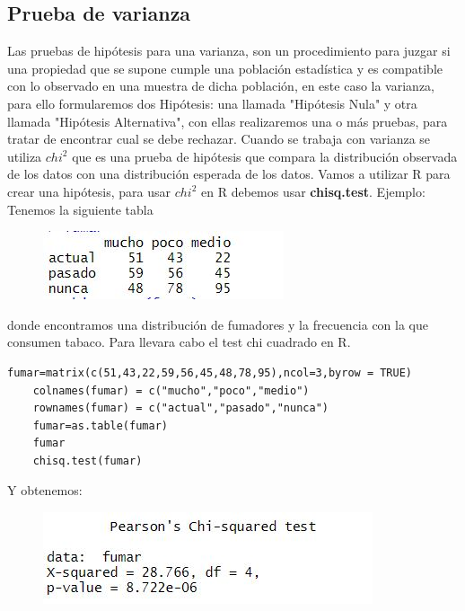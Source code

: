 \documentclass[12pt,hidelinks]{article}
\begin{document}
\subsection{Prueba de varianza}
Las pruebas de hipótesis para una varianza, son un procedimiento para juzgar si una propiedad que se supone cumple una población estadística y es compatible con lo observado en una muestra de dicha población, en este caso la varianza, para ello formularemos dos Hipótesis: una llamada "Hipótesis Nula" y otra llamada "Hipótesis Alternativa", con ellas realizaremos una o más pruebas, para tratar de encontrar cual se debe rechazar. Cuando se trabaja con varianza se utiliza $chi^2$ que es una prueba de hipótesis que compara la distribución observada de los datos con una distribución esperada de los datos.
Vamos a utilizar R para crear una hipótesis, para usar $chi^2$ en R debemos usar \textbf{chisq.test}. Ejemplo: Tenemos la siguiente tabla
\begin{figure}[h!]
	\centering
	\includegraphics[width=0.6\linewidth]{images/3/chi.JPG}
\end{figure}
donde encontramos una distribución de fumadores y la frecuencia con la que consumen tabaco. Para llevara cabo el test chi cuadrado en R.
\begin{lstlisting}[frame=single]
	fumar=matrix(c(51,43,22,59,56,45,48,78,95),ncol=3,byrow = TRUE)
	colnames(fumar) = c("mucho","poco","medio")
	rownames(fumar) = c("actual","pasado","nunca")
	fumar=as.table(fumar)
	fumar
	chisq.test(fumar)
\end{lstlisting}
Y obtenemos:
\begin{figure}[h!]
	\centering
	\includegraphics[width=0.8\linewidth]{images/3/chires.JPG}
\end{figure}
\end{document}
